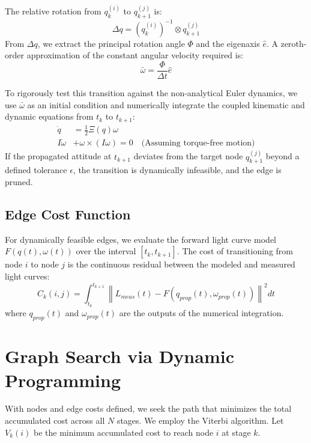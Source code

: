 \documentclass{article}
\begin{document}
The relative rotation from $q_k^{(i)}$ to $q_{k+1}^{(j)}$ is:
\begin{equation}
    \Delta q = \left( q_k^{(i)} \right)^{-1} \otimes q_{k+1}^{(j)}
\end{equation}
From $\Delta q$, we extract the principal rotation angle $\Phi$ and the eigenaxis $\hat{e}$. A zeroth-order approximation of the constant angular velocity required is:
\begin{equation}
    \bar{\omega} = \frac{\Phi}{\Delta t} \hat{e}
\end{equation}

To rigorously test this transition against the non-analytical Euler dynamics, we use $\bar{\omega}$ as an initial condition and numerically integrate the coupled kinematic and dynamic equations from $t_k$ to $t_{k+1}$:
\begin{align}
    \dot{q} &= \frac{1}{2} \Xi(q) \omega \\
    I \dot{\omega} &+ \omega \times (I \omega) = 0 \quad \text{(Assuming torque-free motion)}
\end{align}
If the propagated attitude at $t_{k+1}$ deviates from the target node $q_{k+1}^{(j)}$ beyond a defined tolerance $\epsilon$, the transition is dynamically infeasible, and the edge is pruned. 

\subsection{Edge Cost Function}
For dynamically feasible edges, we evaluate the forward light curve model $F(q(t), \omega(t))$ over the interval $[t_k, t_{k+1}]$. The cost of transitioning from node $i$ to node $j$ is the continuous residual between the modeled and measured light curves:
\begin{equation}
    C_k(i, j) = \int_{t_k}^{t_{k+1}} \left\| L_{meas}(t) - F(q_{prop}(t), \omega_{prop}(t)) \right\|^2 dt
\end{equation}
where $q_{prop}(t)$ and $\omega_{prop}(t)$ are the outputs of the numerical integration.

\section{Graph Search via Dynamic Programming}
With nodes and edge costs defined, we seek the path that minimizes the total accumulated cost across all $N$ stages. We employ the Viterbi algorithm. Let $V_k(i)$ be the minimum accumulated cost to reach node $i$ at stage $k$.
\end{document}
